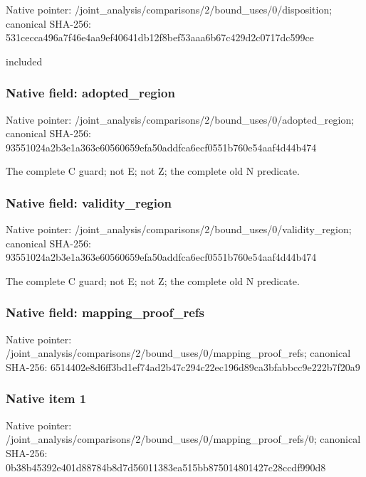 \documentclass[10pt,a4paper]{article}
\begin{document}
Native pointer: /joint\_analysis/comparis\allowbreak{}ons/2/bound\_uses/0/dispo\allowbreak{}sition; canonical SHA-256: 531cecca496a7f46e4aa9ef4\allowbreak{}0641db12f8bef53aaa6b67c4\allowbreak{}29d2c0717dc599ce


included


\subsubsection{Native field: adopted\_region}


Native pointer: /joint\_analysis/comparis\allowbreak{}ons/2/bound\_uses/0/adopt\allowbreak{}ed\_region; canonical SHA-256: 93551024a2b3e1a363e60560\allowbreak{}659efa50addfca6ecf0551b7\allowbreak{}60e54aaf4d44b474


The complete C guard; not E; not Z; the complete old N predicate.


\subsubsection{Native field: validity\_region}


Native pointer: /joint\_analysis/comparis\allowbreak{}ons/2/bound\_uses/0/valid\allowbreak{}ity\_region; canonical SHA-256: 93551024a2b3e1a363e60560\allowbreak{}659efa50addfca6ecf0551b7\allowbreak{}60e54aaf4d44b474


The complete C guard; not E; not Z; the complete old N predicate.


\subsubsection{Native field: mapping\_proof\_refs}


Native pointer: /joint\_analysis/comparis\allowbreak{}ons/2/bound\_uses/0/mappi\allowbreak{}ng\_proof\_refs; canonical SHA-256: 6514402e8d6ff3bd1ef74ad2\allowbreak{}b47c294c22ec196d89ca3bfa\allowbreak{}bbcc9e222b7f20a9



\subsubsection{Native item 1}


Native pointer: /joint\_analysis/comparis\allowbreak{}ons/2/bound\_uses/0/mappi\allowbreak{}ng\_proof\_refs/0; canonical SHA-256: 0b38b45392e401d88784b8d7\allowbreak{}d56011383ea515bb87501480\allowbreak{}1427c28ccdf990d8
\end{document}
